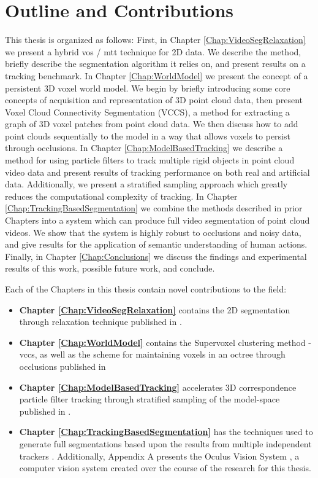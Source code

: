 \section{Outline and Contributions}

This thesis is organized as follows: First, in Chapter \ref{Chap:VideoSegRelaxation} we present a hybrid \gls{vos} / \gls{mtt} technique for 2D data. We describe the method, briefly describe the segmentation algorithm it relies on, and present results on a tracking benchmark. In Chapter \ref{Chap:WorldModel} we present the concept of a persistent 3D voxel world model. We begin by briefly introducing some core concepts of acquisition and representation of 3D point cloud data, then present Voxel Cloud Connectivity Segmentation (VCCS), a method for extracting a graph of 3D voxel patches from point cloud data. We then discuss how to add point clouds sequentially to the model in a way that allows voxels to persist through occlusions. In Chapter \ref{Chap:ModelBasedTracking} we describe a method for using particle filters to track multiple rigid objects in point cloud video data and present results of tracking performance on both real and artificial data. Additionally, we present a stratified sampling approach which greatly reduces the computational complexity of tracking. In Chapter \ref{Chap:TrackingBasedSegmentation} we combine the methods described in prior Chapters into a system which can produce full video segmentation of point cloud videos. We show that the system is highly robust to occlusions and noisy data, and give results for the application of semantic understanding of human actions. Finally, in Chapter \ref{Chap:Conclusions} we discuss the findings and experimental results of this work, possible future work, and conclude.

Each of the Chapters in this thesis contain novel contributions to the field: 
\begin{itemize}
\item {\bf Chapter \ref{Chap:VideoSegRelaxation} } contains the 2D segmentation through relaxation technique published in \cite{PartFilter_Papon_2012}. 

\item {\bf Chapter \ref{Chap:WorldModel} } contains the Supervoxel clustering method - \gls{vccs}, as well as the scheme for maintaining voxels in an octree through occlusions published in \cite{VCCS_Papon_2013}

\item {\bf Chapter \ref{Chap:ModelBasedTracking} } accelerates 3D correspondence particle filter tracking through stratified sampling of the model-space published in \cite{PaponWACV_2015}. 

\item {\bf Chapter \ref{Chap:TrackingBasedSegmentation} } has the techniques used to generate full segmentations based upon the results from multiple independent trackers \cite{PaponIros2013}. Additionally, Appendix A presents the Oculus Vision System \cite{Oculus_Papon_2012}, a computer vision system created over the course of the research for this thesis.
\end{itemize}

